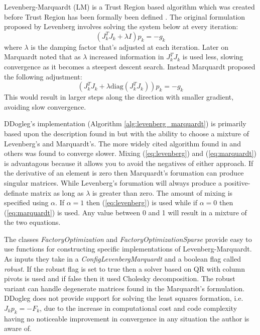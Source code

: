 \documentclass[peerreview,compsoc,onecolumn]{IEEEtran}
\begin{document}
Levenberg-Marquardt (LM) is a Trust Region based algorithm which was created before Trust Region has been formally been defined \cite{numopt2006,fletcher1987,dennis1996}. The original formulation proposed by Levenberg \cite{levenberg1944} involves solving the system below at every iteration:
\begin{equation}
\label{eq:levenberg}
(J_k^T J_k + \lambda I) p_k = -g_k
\end{equation} 
where $\lambda$ is the damping factor that's adjusted at each iteration. Later on Marquardt \cite{marquardt1963} noted that as $\lambda$ increased information in $J_k^T J_k$ is used less, slowing convergence as it becomes a steepest descent search. Instead Marquardt proposed the following adjustment:
\begin{equation}
\label{eq:marquardt}
(J_k^T J_k + \lambda \mbox{diag}(J_k^T J_k)) p_k = -g_k
\end{equation} 
This would result in larger steps along the direction with smaller gradient, avoiding slow convergence.

DDogleg's implementation (Algorithm \ref{alg:levenberg_marquardt}) is primarily based upon the description found in \cite{IMM2004} but with the ability to choose a mixture of Levenberg's and Marquardt's. The more widely cited algorithm found in \cite{fletcher1987} and others was found to converge slower. Mixing (\ref{eq:levenberg}) and (\ref{eq:marquardt}) is advantagous because it allows you to avoid the negatives of either approach. If the derivative of an element is zero then Marquardt's forumation can produce singular matrices. While Levenberg's forumation will always produce a positive-definate matrix as long as $\lambda$ is greater than zero. The amount of mixing is specified using $\alpha$. If $\alpha=1$ then (\ref{eq:levenberg}) is used while if $\alpha=0$ then (\ref{eq:marquardt}) is used. Any value between 0 and 1 will result in a mixture of the two equations.

The classes \emph{FactoryOptimization} and \emph{FactoryOptimizationSparse} provide easy to use functions for constructing specific implementations of Levenberg-Marquardt. As inputs they take in a \emph{ConfigLevenbergMarquardt} and a boolean flag called \emph{robust}. If the robust flag is set to true then a solver based on QR with column pivots is used and if false then it used Cholesky decomposition. The robust variant can handle degenerate matrices found in the Marquardt's formulation. DDogleg does not provide support for solving the least squares formation, i.e. $J_k p_k = -F_k$, due to the increase in computational cost and code complexity having no noticeable improvement in convergence in any situation the author is aware of.
\end{document}
